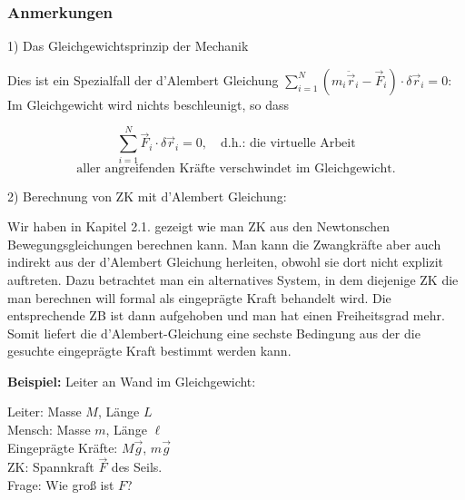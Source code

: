 \documentclass[10pt, letterpaper]{article}
\begin{document}
\subsubsection*{Anmerkungen}

1) Das Gleichgewichtsprinzip der Mechanik

Dies ist ein Spezialfall der d'Alembert Gleichung $\sum_{i=1}^N(m_i\ddot{\vec{r}}_i-\vec{F}_i)\cdot\delta\vec{r}_i=0$:
Im Gleichgewicht wird nichts beschleunigt, so dass

\[\sum_{i=1}^N \vec{F}_i\cdot\delta\vec{r}_i = 0, \quad \text{d.h.: die virtuelle Arbeit}\]
\[\text{aller angreifenden Kräfte verschwindet im Gleichgewicht.}\]


2) Berechnung von ZK mit d'Alembert Gleichung:

Wir haben in Kapitel 2.1. gezeigt wie man ZK aus den Newtonschen Bewegungsgleichungen berechnen kann. Man kann die Zwangkräfte aber auch indirekt aus der d'Alembert Gleichung herleiten, obwohl sie dort nicht explizit auftreten. Dazu betrachtet man ein alternatives System, in dem diejenige ZK die man berechnen will formal als eingeprägte Kraft
behandelt wird. Die entsprechende ZB ist dann aufgehoben und man hat einen Freiheitsgrad mehr. Somit liefert die d'Alembert-Gleichung eine sechste Bedingung aus der die gesuchte eingeprägte Kraft bestimmt werden kann.



\textbf{Beispiel:} Leiter an Wand im Gleichgewicht:

\begin{center}
\end{center}

Leiter: Masse $M$, Länge $L$\\
Mensch: Masse $m$, Länge $\ell$\\
Eingeprägte Kräfte: $M\vec{g}$, $m\vec{g}$\\
ZK: Spannkraft $\vec{F}$ des Seils.\\
Frage: Wie groß ist $F$?
\end{document}
